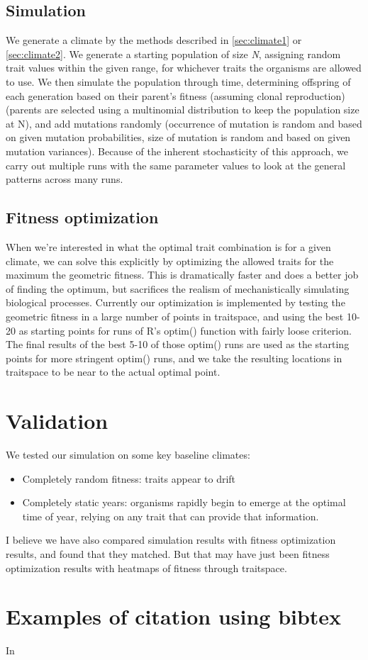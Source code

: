 \documentclass[11pt,a4paper]{article}
\begin{document}
\subsection{Simulation}
We generate a climate by the methods described in \ref{sec:climate1} or \ref{sec:climate2}. We generate a starting population of size \textit{N}, assigning random trait values within the given range, for whichever traits the organisms are allowed to use. We then simulate the population through time, determining offspring of each generation based on their parent's fitness (assuming clonal reproduction) (parents are selected using a multinomial distribution to keep the population size at N), and add mutations randomly (occurrence of mutation is random and based on given mutation probabilities, size of mutation is random and based on given mutation variances). Because of the inherent stochasticity of this approach, we carry out multiple runs with the same parameter values to look at the general patterns across many runs.
\subsection{Fitness optimization}
When we're interested in what the optimal trait combination is for a given climate, we can solve this explicitly by optimizing the allowed traits for the maximum the geometric fitness. This is dramatically faster and does a better job of finding the optimum, but sacrifices the realism of mechanistically simulating biological processes. Currently our optimization is implemented by testing the geometric fitness in a large number of points in traitspace, and using the best 10-20 as starting points for runs of R's optim() function with fairly loose criterion. The final results of the best 5-10 of those optim() runs are used as the starting points for more stringent optim() runs, and we take the resulting locations in traitspace to be near to the actual optimal point. 

\section{Validation}
We tested our simulation on some key baseline climates:
\begin{itemize}
  \item Completely random fitness: traits appear to drift
  \item Completely static years: organisms rapidly begin to emerge at the optimal time of year, relying on any trait that can provide that information.
\end{itemize}
I believe we have also compared simulation results with fitness optimization results, and found that they matched. But that may have just been fitness optimization results with heatmaps of fitness through traitspace.

\clearpage

\section{Examples of citation using bibtex}
In 
\end{document}
